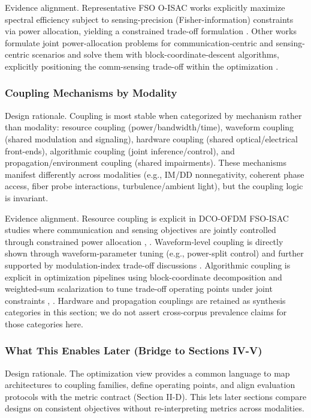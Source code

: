 Evidence alignment. Representative FSO O-ISAC works explicitly maximize spectral efficiency subject to sensing-precision (Fisher-information) constraints via power allocation, yielding a constrained trade-off formulation \cite{O_ISAC_048}.
Other works formulate joint power-allocation problems for communication-centric and sensing-centric scenarios and solve them with block-coordinate-descent algorithms, explicitly positioning the comm-sensing trade-off within the optimization \cite{O_ISAC_023}.

\subsubsection{Coupling Mechanisms by Modality}
Design rationale. Coupling is most stable when categorized by mechanism rather than modality: resource coupling (power/bandwidth/time), waveform coupling (shared modulation and signaling), hardware coupling (shared optical/electrical front-ends), algorithmic coupling (joint inference/control), and propagation/environment coupling (shared impairments). These mechanisms manifest differently across modalities (e.g., IM/DD nonnegativity, coherent phase access, fiber probe interactions, turbulence/ambient light), but the coupling logic is invariant.

Evidence alignment. Resource coupling is explicit in DCO-OFDM FSO-ISAC studies where communication and sensing objectives are jointly controlled through constrained power allocation \cite{O_ISAC_048}, \cite{O_ISAC_023}.
Waveform-level coupling is directly shown through waveform-parameter tuning (e.g., power-split control) \cite{O_ISAC_075} and further supported by modulation-index trade-off discussions \cite{O_ISAC_001}.
Algorithmic coupling is explicit in optimization pipelines using block-coordinate decomposition and weighted-sum scalarization to tune trade-off operating points under joint constraints \cite{O_ISAC_023}, \cite{O_ISAC_052}.
Hardware and propagation couplings are retained as synthesis categories in this section; we do not assert cross-corpus prevalence claims for those categories here.

\subsubsection{What This Enables Later (Bridge to Sections IV-V)}
Design rationale. The optimization view provides a common language to map architectures to coupling families, define operating points, and align evaluation protocols with the metric contract (Section II-D). This lets later sections compare designs on consistent objectives without re-interpreting metrics across modalities.

